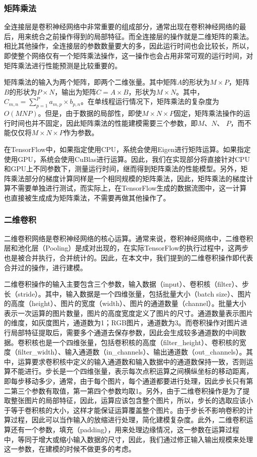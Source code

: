 \subsubsection{矩阵乘法}
\label{overview:matmul}
    全连接层是卷积神经网络中非常重要的组成部分，通常出现在卷积神经网络的最后，用来统合之前操作得到的局部特征。而全连接层的操作就是二维矩阵的乘法。相比其他操作，全连接层的参数数量要大的多，因此运行时间也会比较长，所以，即使整个网络仅有一个矩阵乘法操作，这一操作也会占用非常可观的运行时间，对矩阵乘法进行性能预测是比较重要的。
    
    矩阵乘法的输入为两个矩阵，即两个二维张量。其中矩阵$ A $的形状为$ M \times P $，矩阵$ B $的形状为$ P \times N $，输出为矩阵$ C = A \times B $，形状为$M \times N$。其中，$ C_{m, n} = \sum_{p=1}^P{a_{m, p} \times b_{p, n}} $。在单线程运行情况下，矩阵乘法的复杂度为$ O( M NP) $。但是，由于数据的局部性，即使$ M \times N \times P $固定，矩阵乘法操作的运行时间也并不固定，因此矩阵乘法的性能建模需要三个参数，即$ M $、$ N $、 $ P $，而不能仅仅将$ M \times N \times P $作为参数。
    
    在TensorFlow中，如果指定使用CPU，系统会使用Eigen\cite{eigen}进行矩阵运算。如果指定使用GPU，系统会使用CuBlas进行运算。因此，我们在实现部分将直接针对CPU和GPU上不同参数下，测量运行时间，继而得到矩阵乘法的性能模型。另外，矩阵乘法部分的梯度计算同样是一个相同规模的矩阵乘法，因此，矩阵乘法的梯度计算不需要单独进行测试，而实际上，在TensorFlow生成的数据流图中，这一计算也直接被生成成为矩阵乘法，不需要再做其他操作了。

\subsubsection{二维卷积}
    二维卷积网络是卷积神经网络的核心运算。通常来说，卷积神经网络中，二维卷积层和池化层（Pooling）是成对出现的，在实际TensorFlow的执行过程中，这两步也是被合并执行，合并统计的。因此，在本文中，我们提到的二维卷积操作即代表合并过的操作，进行建模。
    
    二维卷积操作的输入主要包含三个参数，输入数据（input）、卷积核（filter）、步长（stride）。其中，输入数据是一个四维张量，包括批量大小（batch size）、图片的高度（height）、图片的宽度（width）、图片的通道数量（channel）。批量大小表示一次运算的图片数量，图片的高度宽度定义了图片的尺寸。通道数量表示图片的维度，如灰度图片，通道数为1；RGB图片，通道数为3。而卷积操作对图片进行局部特征提取后，需要多个通道去保存参数，因此会生成较多通道数的中间数据。卷积核也是一个四维张量，包括卷积核的高度（filter\_height）、卷积核的宽度（filter\_width）、输入通道数（in\_channels）、输出通道数（out\_channels）。其中，运算要求卷积核中定义的输入通道数和输入数据中的通道数保持一致，否则运算不能进行。步长是一个四维张量，表示每次点积运算之间横纵坐标的移动距离，即每步移动多少，通常，由于每个图片，每个通道都要进行处理，因此步长只有第二第三个参数有取值，第一第四个参数均取1。另外，由于二维卷积操作是为了提取整张图片的局部特征，因此，运算应该包含整个图片，所以，步长的选取应该小于等于卷积核的大小，这样才能保证运算覆盖整个图片。由于步长不影响卷积的计算过程，因此可以当作输入的放缩进行处理，简化建模复杂度。此外，二维卷积运算还有一个参数，填充（padding），用来处理边缘情况，这一参数在运算过程中，等同于增大或缩小输入数据的尺寸，因此，我们通过修正输入输出规模来处理这一参数，在建模的时候不做更多的考虑。
    
